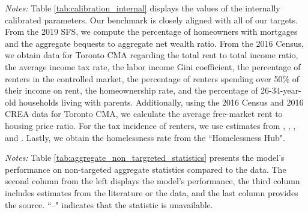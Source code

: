 \documentclass[parskip=full]{article}
\newenvironment{fignote2}[1]
{
\par
\medskip
\begin{minipage}{#1}
\footnotesize
}
{
\end{minipage}
}
\begin{document}
\begin{table}[H]
    \centering
    \caption{Internally assigned parameter values}
    \vspace{-1.25cm}
    \label{tab:calibration_internal}
    
    \vspace{-0.5cm}
    \begin{fignote2}{1.08\textwidth}
    \textit{Notes:} Table \ref{tab:calibration_internal} displays the values of the internally calibrated parameters. Our benchmark is closely aligned with all of our targets. From the 2019 SFS, we compute the percentage of homeowners with mortgages and the aggregate bequests to aggregate net wealth ratio. From the 2016 Census, we obtain data for Toronto CMA regarding the total rent to total income ratio, the average income tax rate, the labor income Gini coefficient, the percentage of renters in the controlled market, the percentage of renters spending over 50\% of their income on rent, the homeownership rate, and the percentage of 26-34-year-old households living with parents. Additionally, using the 2016 Census and 2016 CREA data for Toronto CMA, we calculate the average free-market rent to housing price ratio. For the tax incidence of renters, we use estimates from \citet{cy-1994}, \citet{susin-2002}, \citet{fack-2006}, and \citet{sy-2020}. Lastly, we obtain the homelessness rate from the ``Homelessness Hub".
    \end{fignote2}
\end{table}

\begin{table}[H]
    \centering
    \caption{Aggregate non-targeted statistics}
    \vspace{-0.5cm}
    \label{tab:aggregate_non_targreted_statistics}  
    \vspace{-0.45cm}
    \begin{fignote2}{0.84\textwidth}
      \textit{Notes:} Table \ref{tab:aggregate_non_targreted_statistics} presents the model's performance on non-targeted aggregate statistics compared to the data. The second column from the left displays the model's performance, the third column includes estimates from the literature or the data, and the last column provides the source. ``--" indicates that the statistic is unavailable.
    \end{fignote2}
\end{table}
\end{document}
